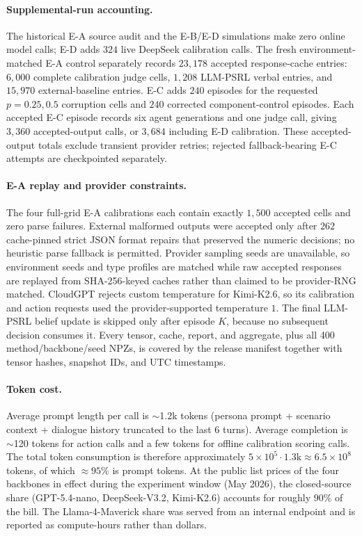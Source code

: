 \paragraph{Supplemental-run accounting.} The historical E-A source audit and the E-B/E-D simulations make zero online model calls; E-D adds $324$ live DeepSeek calibration calls. The fresh environment-matched E-A control separately records $23{,}178$ accepted response-cache entries: $6{,}000$ complete calibration judge cells, $1{,}208$ LLM-PSRL verbal entries, and $15{,}970$ external-baseline entries. E-C adds $240$ episodes for the requested $p{=}0.25,0.5$ corruption cells and $240$ corrected component-control episodes. Each accepted E-C episode records six agent generations and one judge call, giving $3{,}360$ accepted-output calls, or $3{,}684$ including E-D calibration. These accepted-output totals exclude transient provider retries; rejected fallback-bearing E-C attempts are checkpointed separately.

\paragraph{E-A replay and provider constraints.} The four full-grid E-A calibrations each contain exactly $1{,}500$ accepted cells and zero parse failures. External malformed outputs were accepted only after $262$ cache-pinned strict JSON format repairs that preserved the numeric decisions; no heuristic parse fallback is permitted. Provider sampling seeds are unavailable, so environment seeds and type profiles are matched while raw accepted responses are replayed from SHA-256-keyed caches rather than claimed to be provider-RNG matched. CloudGPT rejects custom temperature for Kimi-K2.6, so its calibration and action requests used the provider-supported temperature $1$. The final LLM-PSRL belief update is skipped only after episode $K$, because no subsequent decision consumes it. Every tensor, cache, report, and aggregate, plus all 400 method/backbone/seed NPZs, is covered by the release manifest together with tensor hashes, snapshot IDs, and UTC timestamps.

\paragraph{Token cost.} Average prompt length per call is $\sim$1.2k tokens (persona prompt + scenario context + dialogue history truncated to the last 6 turns). Average completion is $\sim$120 tokens for action calls and a few tokens for offline calibration scoring calls. The total token consumption is therefore approximately $5{\times}10^5\cdot 1.3\text{k} \approx 6.5{\times}10^8$ tokens, of which $\approx 95\%$ is prompt tokens. At the public list prices of the four backbones in effect during the experiment window (May 2026), the closed-source share (GPT-5.4-nano, DeepSeek-V3.2, Kimi-K2.6) accounts for roughly $90\%$ of the bill. The Llama-4-Maverick share was served from an internal endpoint and is reported as compute-hours rather than dollars.

